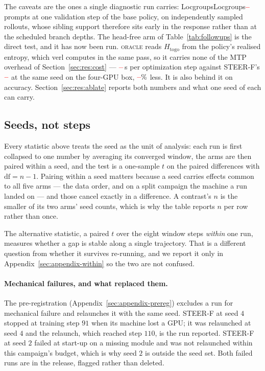 \documentclass[11pt]{article}
\newcommand{\Htogo}{H_{\mathrm{togo}}}
\providecommand{\PENDING}{\textcolor{red}{\textbf{--}}}
\newcommand{\num}[1]{\ifcsname #1\endcsname\csname #1\endcsname\else\PENDING\fi}
\begin{document}
The caveats are the ones a single diagnostic run carries: \num{Locgroups}
prompts at one validation step of the base policy, on independently sampled
rollouts, whose sibling support therefore sits early in the response rather
than at the scheduled branch depths. The head-free arm of
Table~\ref{tab:followups} is the direct test, and it has now been run.
\textsc{oracle} reads $\Htogo$ from the policy's realised entropy, which verl
\citep{sheng2025hybridflow} computes in the same pass, so it carries none of the MTP overhead of
Section~\ref{sec:res:cost} --- $\num{Roraclecost}$\,s per optimization step
against STEER-F's $\num{Fsignedoracleref}$ at the same seed on the four-GPU box,
$\num{Fsignedoraclesaving}\%$ less. It is also
behind it on accuracy. Section~\ref{sec:res:ablate} reports both numbers and what
one seed of each can carry.

\subsection{Seeds, not steps}
\label{sec:res:seeds}

Every statistic above treats the seed as the unit of analysis: each run is first
collapsed to one number by averaging its converged window, the arms are then paired
within a seed, and the test is a one-sample $t$ on the paired differences with
$\mathrm{df} = n - 1$. Pairing within a seed matters because a seed carries effects
common to all five arms --- the data order, and on a split campaign the machine a run
landed on --- and those cancel exactly in a difference. A contrast's $n$ is the
smaller of its two arms' seed counts, which is why the table reports $n$ per row
rather than once.

The alternative statistic, a paired $t$ over the eight window steps \emph{within} one
run, measures whether a gap is stable along a single trajectory. That is a different
question from whether it survives re-running, and we report it only in
Appendix~\ref{sec:appendix-within} so the two are not confused.

\paragraph{Mechanical failures, and what replaced them.} The pre-registration
(Appendix~\ref{sec:appendix-prereg}) excludes a run for mechanical failure and
relaunches it with the same seed. STEER-F at seed $4$ stopped at training step $91$
when its machine lost a GPU; it was relaunched at seed $4$ and the relaunch, which
reached step $110$, is the run reported. STEER-F at seed $2$ failed at start-up on a
missing module and was not relaunched within this campaign's budget, which is why
seed $2$ is outside the seed set. Both failed runs are in the release, flagged
rather than deleted.
\end{document}
